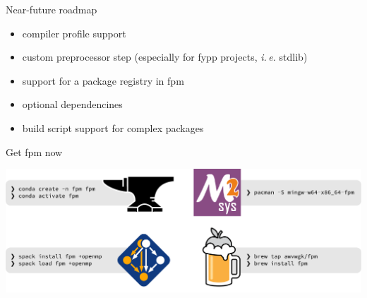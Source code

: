 \documentclass[lualatex,10pt,aspectratio=169]{beamer}
\begin{document}
\begin{frame}{Near-future roadmap}
   \begin{itemize}
      \item compiler profile support
      \item custom preprocessor step (especially for fypp projects, \textit{i.\,e.} stdlib)
      \item support for a package registry in fpm
      \item optional dependencines
      \item build script support for complex packages
   \end{itemize}
\end{frame}

\begin{frame}{Get fpm now}
   \begin{center}
      \includegraphics[width=.8\textwidth]{Figures/get-fpm.pdf}
   \end{center}
\end{frame}
\end{document}
